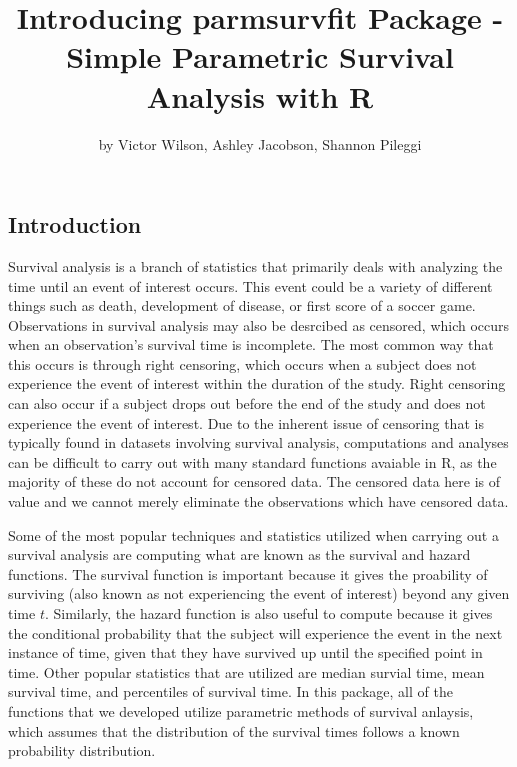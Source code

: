 \title{Introducing parmsurvfit Package - Simple Parametric Survival Analysis
with R}
\author{by Victor Wilson, Ashley Jacobson, Shannon Pileggi}

\maketitle



\hypertarget{introduction}{%
\subsection{Introduction}\label{introduction}}

Survival analysis is a branch of statistics that primarily deals with
analyzing the time until an event of interest occurs. This event could
be a variety of different things such as death, development of disease,
or first score of a soccer game. Observations in survival analysis may
also be desrcibed as censored, which occurs when an observation's
survival time is incomplete. The most common way that this occurs is
through right censoring, which occurs when a subject does not experience
the event of interest within the duration of the study. Right censoring
can also occur if a subject drops out before the end of the study and
does not experience the event of interest. Due to the inherent issue of
censoring that is typically found in datasets involving survival
analysis, computations and analyses can be difficult to carry out with
many standard functions avaiable in R, as the majority of these do not
account for censored data. The censored data here is of value and we
cannot merely eliminate the observations which have censored data.

Some of the most popular techniques and statistics utilized when
carrying out a survival analysis are computing what are known as the
survival and hazard functions. The survival function is important
because it gives the proability of surviving (also known as not
experiencing the event of interest) beyond any given time \(t\).
Similarly, the hazard function is also useful to compute because it
gives the conditional probability that the subject will experience the
event in the next instance of time, given that they have survived up
until the specified point in time. Other popular statistics that are
utilized are median survial time, mean survival time, and percentiles of
survival time. In this package, all of the functions that we developed
utilize parametric methods of survival anlaysis, which assumes that the
distribution of the survival times follows a known probability
distribution.

